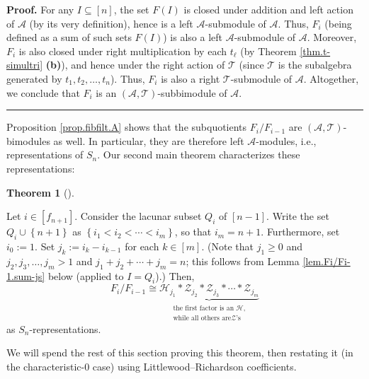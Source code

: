 \documentclass[numbers=enddot,12pt,final,onecolumn,notitlepage]{scrartcl}%
\theoremstyle{definition}
\newtheorem{theo}{Theorem}[section]
\newenvironment{theorem}[1][]
{\begin{theo}[#1]\begin{leftbar}}
{\end{leftbar}\end{theo}}
\newenvironment{proof}[1][Proof]{\noindent\textbf{#1.} }{\ \rule{0.5em}{0.5em}}
\begin{document}
\begin{proof}
For any $I\subseteq\left[  n\right]  $, the set $F\left(  I\right)  $ is
closed under addition and left action of $\mathcal{A}$ (by its very
definition), hence is a left $\mathcal{A}$-submodule of $\mathcal{A}$. Thus,
$F_{i}$ (being defined as a sum of such sets $F\left(  I\right)  $) is also a
left $\mathcal{A}$-submodule of $\mathcal{A}$. Moreover, $F_{i}$ is also
closed under right multiplication by each $t_{\ell}$ (by Theorem
\ref{thm.t-simultri} \textbf{(b)}), and hence under the right action of
$\mathcal{T}$ (since $\mathcal{T}$ is the subalgebra generated by $t_{1}%
,t_{2},\ldots,t_{n}$). Thus, $F_{i}$ is also a right $\mathcal{T}$-submodule
of $\mathcal{A}$. Altogether, we conclude that $F_{i}$ is an $\left(
\mathcal{A},\mathcal{T}\right)  $-subbimodule of $\mathcal{A}$.
\end{proof}

Proposition \ref{prop.fibfilt.A} shows that the subquotients $F_{i}/F_{i-1}$
are $\left(  \mathcal{A},\mathcal{T}\right)  $-bimodules as well. In
particular, they are therefore left $\mathcal{A}$-modules, i.e.,
representations of $S_{n}$. Our second main theorem characterizes these representations:

\begin{theorem}
\label{thm.Fi/Fi-1.as-ind}Let $i\in\left[  f_{n+1}\right]  $. Consider the
lacunar subset $Q_{i}$ of $\left[  n-1\right]  $. Write the set $Q_{i}%
\cup\left\{  n+1\right\}  $ as $\left\{  i_{1}<i_{2}<\cdots<i_{m}\right\}  $,
so that $i_{m}=n+1$. Furthermore, set $i_{0}:=1$. Set $j_{k}:=i_{k}-i_{k-1}$
for each $k\in\left[  m\right]  $. (Note that $j_{1}\geq0$ and $j_{2}%
,j_{3},\ldots,j_{m}>1$ and $j_{1}+j_{2}+\cdots+j_{m}=n$; this follows from
Lemma \ref{lem.Fi/Fi-1.sum-js} below (applied to $I=Q_{i}$).) Then,%
\[
F_{i}/F_{i-1}\cong\underbrace{\mathcal{H}_{j_{1}}\ast\mathcal{Z}_{j_{2}}%
\ast\mathcal{Z}_{j_{3}}\ast\cdots\ast\mathcal{Z}_{j_{m}}}_{\substack{\text{the
first factor is an }\mathcal{H}\text{,}\\\text{while all others are
}\mathcal{Z}\text{'s}}}
\]
as $S_{n}$-representations.\footnotemark
\end{theorem}

We will spend the rest of this section proving this theorem, then
restating it (in the characteristic-$0$ case) using Littlewood--Richardson coefficients.
\end{document}
